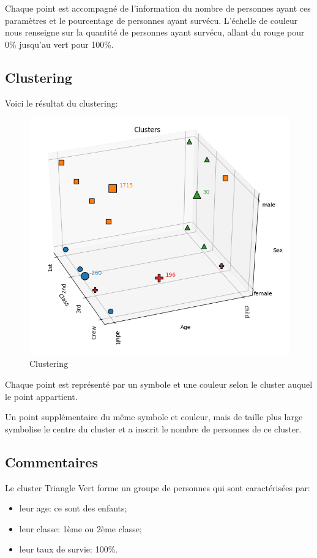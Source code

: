 \documentclass[11pt, a4paper]{article}
\begin{document}
Chaque point est accompagné de l'information du nombre de personnes ayant ces paramètres et le pourcentage de personnes ayant survécu.
L'échelle de couleur nous renseigne sur la quantité de personnes ayant survécu, allant du rouge pour 0\% jusqu'au vert pour 100\%.


\subsection{Clustering}

Voici le résultat du clustering:

\begin{figure}[H]
    \begin{center}
        \includegraphics[width=.8\textwidth]{ex1_clusters}
    \end{center}
    \caption{Clustering}
    \label{Clustering}
\end{figure}


Chaque point est représenté par un symbole et une couleur selon le cluster auquel le point appartient.

Un point supplémentaire du même symbole et couleur,
mais de taille plus large symbolise le centre du cluster et a inscrit le nombre de personnes de ce cluster.

\subsection{Commentaires}

Le cluster Triangle Vert forme un groupe de personnes qui sont caractérisées par:
\begin{itemize}
    \item leur age: ce sont des enfants;
    \item leur classe: 1ème ou 2ème classe;
    \item leur taux de survie: 100\%.\\
\end{itemize}
\end{document}

